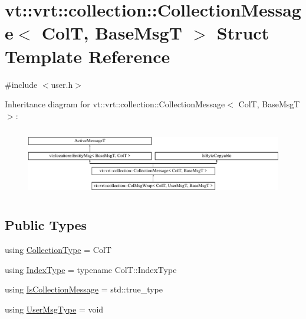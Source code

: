 \hypertarget{structvt_1_1vrt_1_1collection_1_1_collection_message}{}\section{vt\+:\+:vrt\+:\+:collection\+:\+:Collection\+Message$<$ ColT, Base\+MsgT $>$ Struct Template Reference}
\label{structvt_1_1vrt_1_1collection_1_1_collection_message}


{\ttfamily \#include $<$user.\+h$>$}

Inheritance diagram for vt\+:\+:vrt\+:\+:collection\+:\+:Collection\+Message$<$ ColT, Base\+MsgT $>$\+:\begin{figure}[H]
\begin{center}
\leavevmode
\includegraphics[height=2.994652cm]{structvt_1_1vrt_1_1collection_1_1_collection_message}
\end{center}
\end{figure}
\subsection*{Public Types}
\begin{DoxyCompactItemize}
\item 
using \hyperlink{structvt_1_1vrt_1_1collection_1_1_collection_message_afa8f7f5da0139ffa449144d8d35d7fe3}{Collection\+Type} = ColT
\item 
using \hyperlink{structvt_1_1vrt_1_1collection_1_1_collection_message_a324978c38e67d1bfa86c8db172e77594}{Index\+Type} = typename Col\+T\+::\+Index\+Type
\item 
using \hyperlink{structvt_1_1vrt_1_1collection_1_1_collection_message_a186fceb015a3415a482d99851432222b}{Is\+Collection\+Message} = std\+::true\+\_\+type
\item 
using \hyperlink{structvt_1_1vrt_1_1collection_1_1_collection_message_ace5b4eaa94f5b209ae321edd6c0b6c19}{User\+Msg\+Type} = void
\end{DoxyCompactItemize}
